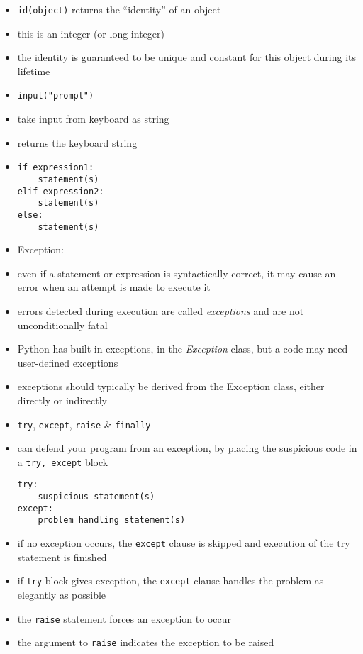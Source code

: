 \documentclass[onecolumn]{IEEEtran} %
\begin{document}
\begin{itemize}
        \item \verb|id(object)| returns the “identity” of an object
        \item this is an integer (or long integer)
        \item the identity is guaranteed to be unique and constant for this object during its lifetime
    \ei
    \item \verb|input("prompt")|
    \bi
        \item take input from keyboard as string
        \item returns the keyboard string
    \ei
    \item \begin{verbatim}
if expression1:
    statement(s)
elif expression2:
    statement(s)
else:
    statement(s)
    \end{verbatim}
    \item Exception:
    \bi
        \item even if a statement or expression is syntactically correct, it may cause an error when an attempt is made to execute it
        \item errors detected during execution are called \emph{exceptions} and are not unconditionally fatal
        \item Python has built-in exceptions, in the \emph{Exception} class, but a code may need user-defined exceptions
        \bi
            \item exceptions should typically be derived from the Exception class, either directly or indirectly
        \ei
    \ei
    \item \verb|try|, \verb|except|, \verb|raise| \& \verb|finally|
    \bi
        \item can defend your program from an exception, by placing the suspicious code in a \verb|try, except| block
\begin{verbatim}
try:
    suspicious statement(s)
except:
    problem handling statement(s)
\end{verbatim}
        \item if no exception occurs, the \verb|except| clause is skipped and execution of the try statement is finished
        \item if \verb|try| block gives exception, the \verb|except| clause handles the problem as elegantly as possible
        \item the \verb|raise| statement forces an exception to occur
        \item the argument to \verb|raise| indicates the exception to be raised

\end{itemize}
\end{document}
